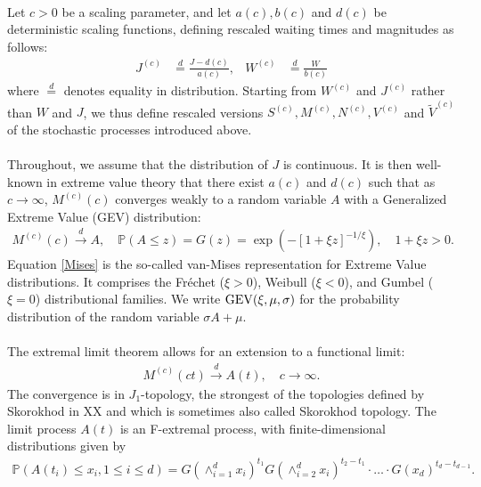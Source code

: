 \documentclass[12pt, a4paper]{article}
\newcommand{\PP}{\mathbb{P}}
\newcommand{\1}{\mathbf 1}
\begin{document}
\paragraph{}
Let $c > 0$ be a scaling parameter, and let 
$a(c), b(c)$ and $d(c)$ be deterministic scaling functions,
defining rescaled waiting times and magnitudes as follows: 
\begin{align}
J^{(c)} &\stackrel{d}{=} \frac{J - d(c)}{a(c)}, 
& 
W^{(c)} &\stackrel{d}{=} \frac{W}{b(c)}
\end{align}
where $\stackrel{d}{=}$ denotes equality in distribution. 
Starting from $W^{(c)}$ and $J^{(c)}$ rather than $W$ and $J$, we thus define rescaled 
versions $S^{(c)}, M^{(c)}, N^{(c)}, V^{(c)}$ and $\tilde V^{(c)}$ of the 
stochastic processes introduced above. 

\paragraph{}
Throughout, we assume that the distribution of $J$ is continuous. 
It is then well-known in extreme value theory that there exist $a(c)$ and $d(c)$
such that as $c \to \infty$,
$M^{(c)}(c)$ converges weakly to a random variable $A$ with a
Generalized Extreme Value (GEV) distribution: 
\begin{align}
M^{(c)}(c) \stackrel{d}{\to} A,
\quad \PP(A \le z) = G(z) = \exp\left(-[1+\xi z]^{-1/\xi}\right), 
\quad 1 + \xi z > 0. \label{Mises}
\end{align}
Equation \eqref{Mises} is the so-called van-Mises representation for 
Extreme Value distributions. 
It comprises the Fr\'echet ($\xi>0$), Weibull ($\xi<0$),
and Gumbel ($\xi = 0$) distributional families. 
We write ${\rm GEV}(\xi, \mu, \sigma)$ for the probability 
distribution of the random variable $\sigma A + \mu$. 

\paragraph{}
The extremal limit theorem allows for an extension to a functional
limit: 
\begin{align} \label{eq:extremal-limit}
M^{(c)}(ct)
\stackrel{d}{\to} A(t),
\quad c \to \infty.
\end{align}
The convergence is in $J_1$-topology, the strongest of the topologies defined by Skorokhod in XX and which is sometimes also called Skorokhod topology. The limit process $A(t)$ is an F-extremal process, with finite-dimensional distributions given by
\begin{align*}
\PP(A(t_i)\leq x_i,1\leq i \leq d) = G(\wedge_{i=1}^d x_i)^{t_1}  G(\wedge_{i=2}^d x_i)^{t_2-t_1} \cdot \ldots \cdot G(x_d)^{t_d-t_{d-1}}.
\end{align*}
\end{document}
